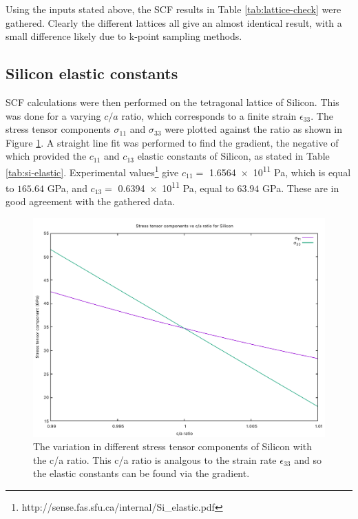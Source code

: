 \documentclass[12pt]{article}
\begin{document}
\noindent Using the inputs stated above, the SCF results in Table \ref{tab:lattice-check} were gathered. Clearly the different lattices all give an almost identical result, with a small difference likely due to k-point sampling methods.

\subsection*{Silicon elastic constants}

\noindent SCF calculations were then performed on the tetragonal lattice of Silicon. This was done for a varying $c/a$ ratio, which corresponds to a finite strain $\epsilon_{33}$. The stress tensor components $\sigma_{11}$ and $\sigma_{33}$ were plotted against the ratio as shown in Figure \ref{fig:si-elastic}. A straight line fit was performed to find the gradient, the negative of which provided the $c_{11}$ and $c_{13}$ elastic constants of Silicon, as stated in Table \ref{tab:si-elastic}. Experimental values\footnote{\label{foot: Si}http://sense.fas.sfu.ca/internal/Si\_elastic.pdf} give $c_{11} = $ \num{1.6564e11} Pa, which is equal to $165.64$ GPa, and $c_{13} = $ \num{0.6394e11} Pa, equal to $63.94$ GPa. These are in good agreement with the gathered data.

\begin{figure}[h!!!!!]
\centering
\includegraphics[width=12cm]{elastic-data/si-elastic-plot.pdf}
\caption{The variation in different stress tensor components of Silicon with the c/a ratio. This c/a ratio is analgous to the strain rate $\epsilon_{33}$ and so the elastic constants can be found via the gradient.}
\label{fig:si-elastic}
\end{figure}
\end{document}
